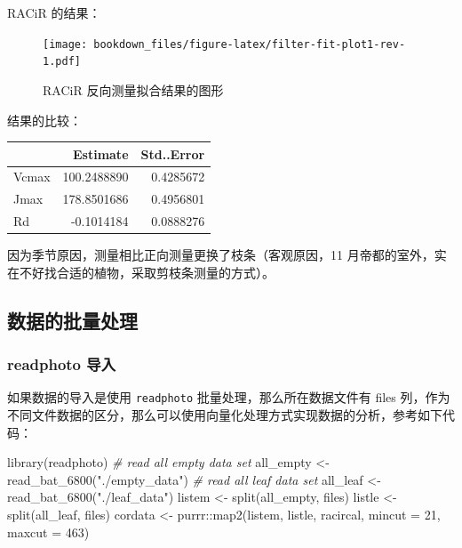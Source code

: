 \documentclass[
]{krantz}
\makeatletter
\newenvironment{Shaded}{\begin{snugshade}}{\end{snugshade}}
\newcommand{\AttributeTok}[1]{\textcolor[rgb]{0.77,0.63,0.00}{#1}}
\newcommand{\CommentTok}[1]{\textcolor[rgb]{0.56,0.35,0.01}{\textit{#1}}}
\newcommand{\DecValTok}[1]{\textcolor[rgb]{0.00,0.00,0.81}{#1}}
\newcommand{\FunctionTok}[1]{\textcolor[rgb]{0.00,0.00,0.00}{#1}}
\newcommand{\NormalTok}[1]{#1}
\newcommand{\OtherTok}[1]{\textcolor[rgb]{0.56,0.35,0.01}{#1}}
\newcommand{\SpecialCharTok}[1]{\textcolor[rgb]{0.00,0.00,0.00}{#1}}
\newcommand{\StringTok}[1]{\textcolor[rgb]{0.31,0.60,0.02}{#1}}
\newenvironment{kframe}{%
\medskip{}
\setlength{\fboxsep}{.8em}
 \def\at@end@of@kframe{}%
 \ifinner\ifhmode%
  \def\at@end@of@kframe{\end{minipage}}%
  \begin{minipage}{\columnwidth}%
 \fi\fi%
 \def\FrameCommand##1{\hskip\@totalleftmargin \hskip-\fboxsep
 \colorbox{shadecolor}{##1}\hskip-\fboxsep
     \hskip-\linewidth \hskip-\@totalleftmargin \hskip\columnwidth}%
 \MakeFramed {\advance\hsize-\width
   \@totalleftmargin\z@ \linewidth\hsize
   \@setminipage}}%
 {\par\unskip\endMakeFramed%
 \at@end@of@kframe}
\renewenvironment{Shaded}{\begin{kframe}}{\end{kframe}}
\makeatother
\begin{document}
RACiR 的结果：

\begin{figure}
\centering
\texttt{[image: bookdown\_files/figure-latex/filter-fit-plot1-rev-1.pdf]}
\caption{\label{fig:filter-fit-plot1-rev}RACiR 反向测量拟合结果的图形}
\end{figure}

结果的比较：

\begin{tabular}{l|r|r}
\hline
  & Estimate & Std..Error\\
\hline
Vcmax & 100.2488890 & 0.4285672\\
\hline
Jmax & 178.8501686 & 0.4956801\\
\hline
Rd & -0.1014184 & 0.0888276\\
\hline
\end{tabular}

因为季节原因，测量相比正向测量更换了枝条（客观原因，11 月帝都的室外，实在不好找合适的植物，采取剪枝条测量的方式）。

\hypertarget{racirbatch}{%
\subsection{数据的批量处理}\label{racirbatch}}

\hypertarget{imbyphoto}{%
\subsubsection{readphoto 导入}\label{imbyphoto}}

如果数据的导入是使用 \texttt{readphoto} 批量处理，那么所在数据文件有 files 列，作为不同文件数据的区分，那么可以使用向量化处理方式实现数据的分析，参考如下代码：

\begin{Shaded}
\begin{Highlighting}[]
\FunctionTok{library}\NormalTok{(readphoto)}
\CommentTok{\# read all empty data set}
\NormalTok{all\_empty }\OtherTok{\textless{}{-}} \FunctionTok{read\_bat\_6800}\NormalTok{(}\StringTok{"./empty\_data"}\NormalTok{)}
\CommentTok{\# read all leaf data set}
\NormalTok{all\_leaf }\OtherTok{\textless{}{-}} \FunctionTok{read\_bat\_6800}\NormalTok{(}\StringTok{"./leaf\_data"}\NormalTok{)}
\NormalTok{listem  }\OtherTok{\textless{}{-}}  \FunctionTok{split}\NormalTok{(all\_empty, files)}
\NormalTok{listle }\OtherTok{\textless{}{-}}  \FunctionTok{split}\NormalTok{(all\_leaf, files)}
\NormalTok{cordata }\OtherTok{\textless{}{-}}\NormalTok{ purrr}\SpecialCharTok{::}\FunctionTok{map2}\NormalTok{(listem, listle, racircal, }\AttributeTok{mincut =} \DecValTok{21}\NormalTok{, }\AttributeTok{maxcut =} \DecValTok{463}\NormalTok{)}
\end{Highlighting}
\end{Shaded}
\end{document}
